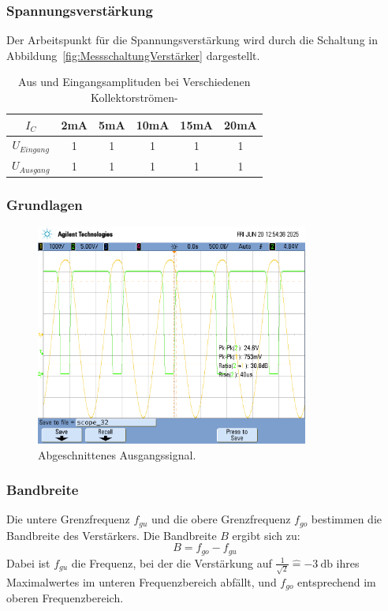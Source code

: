 \documentclass[
	a4paper, %
	12pt, %
]{CSUniSchoolLabReport}
\begin{document}
\subsubsection{Spannungsverstärkung}
Der Arbeitspunkt für die Spannungsverstärkung wird durch die Schaltung in Abbildung~\ref{fig:MessschaltungVerstärker} dargestellt.
\begin{table}[H]
\centering
\begin{tabular}{c|c|c|c|c|c}
$I_{C}$      & 2mA & 5mA & 10mA & 15mA & 20mA \\ \hline
$U_{Eingang}$ & 1   & 1   & 1    & 1    & 1    \\ \hline
$U_{Ausgang}$ & 1   & 1   & 1    & 1    & 1   
\end{tabular}
\caption{Aus und Eingangsamplituden bei Verschiedenen Kollektorströmen- }
\label{tab:my-table}
\end{table}
\subsubsection{Grundlagen}
\begin{figure}[H]
	\centering
	\includegraphics[width=0.8\textwidth]{Figures/supplyrailskrass.png}
	\caption{Abgeschnittenes Ausgangssignal.}
	\label{fig:supplyrailskrass}
\end{figure}
\subsubsection{Bandbreite}
Die untere Grenzfrequenz $f_{gu}$ und die obere Grenzfrequenz $f_{go}$ bestimmen die Bandbreite des Verstärkers. Die Bandbreite $B$ ergibt sich zu:
\[
B = f_{go} - f_{gu}
\]
Dabei ist $f_{gu}$ die Frequenz, bei der die Verstärkung auf $\frac{1}{\sqrt{2}} \hat{=}\SI{-3}{\decibel}$ ihres Maximalwertes im unteren Frequenzbereich abfällt, und $f_{go}$ entsprechend im oberen Frequenzbereich.
\end{document}
